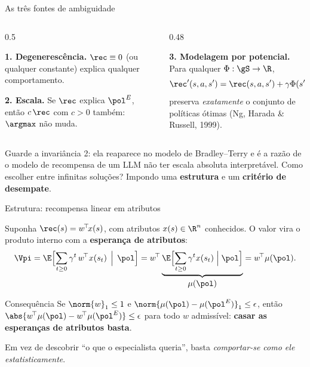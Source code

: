 \documentclass[aspectratio=169, 11pt]{beamer}
\newcommand{\polE}{\pol^{E}}                     %
\begin{document}
\begin{frame}{As três fontes de ambiguidade}

  \begin{columns}[T]
  \begin{column}{0.5\textwidth}
    \begin{alertabox}
      \textbf{1. Degenerescência.} $\rec\equiv 0$ (ou qualquer constante)
      explica qualquer comportamento.
    \end{alertabox}
    \begin{alertabox}
      \textbf{2. Escala.} Se $\rec$ explica $\polE$, então $c\,\rec$ com
      $c>0$ também: $\argmax$ não muda.
    \end{alertabox}
  \end{column}
  \begin{column}{0.48\textwidth}
    \begin{alertabox}
      \textbf{3. Modelagem por potencial.} Para qualquer $\Phi:\gS\to\R$,
      \[
        \rec'(s,a,s') = \rec(s,a,s') + \gamma\Phi(s') - \Phi(s)
      \]
      preserva \emph{exatamente} o conjunto de políticas ótimas
      {\scriptsize(Ng, Harada \& Russell, 1999)}.
    \end{alertabox}
  \end{column}
  \end{columns}

  \begin{ideiabox}
    Guarde a invariância 2: ela reaparece no modelo de Bradley--Terry e é a razão
    de o modelo de recompensa de um LLM não ter escala absoluta interpretável.
    Como escolher entre infinitas soluções? Impondo uma \textbf{estrutura} e um
    \textbf{critério de desempate}.
  \end{ideiabox}
\end{frame}

\begin{frame}{Estrutura: recompensa linear em atributos}

  Suponha $\rec(s) = w^{\!\top}\!x(s)$, com atributos $x(s)\in\R^{n}$ conhecidos.
  O valor vira o produto interno com a \textbf{esperança de atributos}:
  \[
    \Vpi = \E\Bigl[\sum_{t\ge 0}\gamma^{t}\, w^{\!\top} x(s_t) \,\Bigm|\, \pol\Bigr]
      = w^{\!\top} \underbrace{\E\Bigl[\sum_{t\ge 0}\gamma^{t} x(s_t) \Bigm| \pol\Bigr]}_{\textstyle \mu(\pol)}
      = w^{\!\top}\mu(\pol).
  \]

  \begin{teobox}{Consequência}
    Se $\norm{w}_1 \le 1$ e $\norm{\mu(\pol) - \mu(\polE)}_1 \le \epsilon$, então
    $\abs{ w^{\!\top}\mu(\pol) - w^{\!\top}\mu(\polE)} \le \epsilon$ para todo
    $w$ admissível: \textbf{casar as esperanças de atributos basta}.
  \end{teobox}

  \begin{ideiabox}
    Em vez de descobrir ``o que o especialista queria'', basta
    \emph{comportar-se como ele estatisticamente}.
  \end{ideiabox}
\end{frame}
\end{document}

